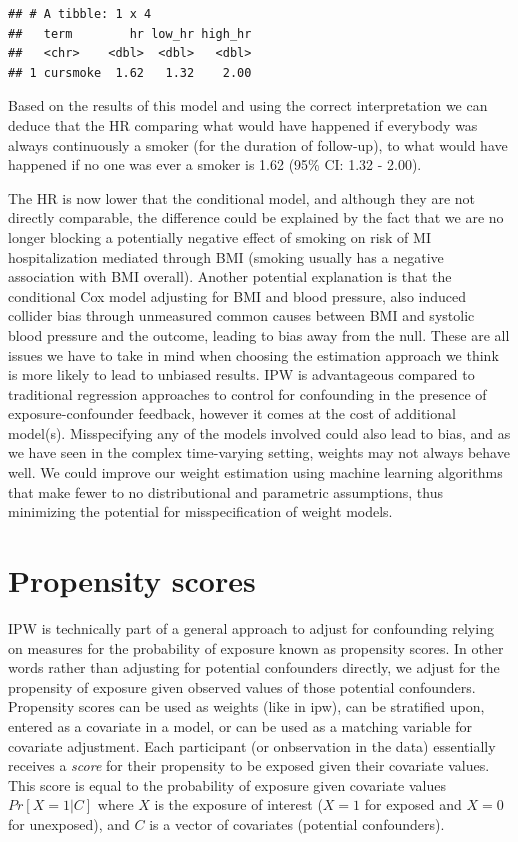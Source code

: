 \documentclass[
]{book}
\begin{document}
\begin{verbatim}
## # A tibble: 1 x 4
##   term        hr low_hr high_hr
##   <chr>    <dbl>  <dbl>   <dbl>
## 1 cursmoke  1.62   1.32    2.00
\end{verbatim}

Based on the results of this model and using the correct interpretation we can deduce that the HR comparing what would have happened if everybody was always continuously a smoker (for the duration of follow-up), to what would have happened if no one was ever a smoker is 1.62 (95\% CI: 1.32 - 2.00).

The HR is now lower that the conditional model, and although they are not directly comparable, the difference could be explained by the fact that we are no longer blocking a potentially negative effect of smoking on risk of MI hospitalization mediated through BMI (smoking usually has a negative association with BMI overall). Another potential explanation is that the conditional Cox model adjusting for BMI and blood pressure, also induced collider bias through unmeasured common causes between BMI and systolic blood pressure and the outcome, leading to bias away from the null. These are all issues we have to take in mind when choosing the estimation approach we think is more likely to lead to unbiased results. IPW is advantageous compared to traditional regression approaches to control for confounding in the presence of exposure-confounder feedback, however it comes at the cost of additional model(s). Misspecifying any of the models involved could also lead to bias, and as we have seen in the complex time-varying setting, weights may not always behave well. We could improve our weight estimation using machine learning algorithms that make fewer to no distributional and parametric assumptions, thus minimizing the potential for misspecification of weight models.

\hypertarget{propensity-scores}{%
\section{Propensity scores}\label{propensity-scores}}

IPW is technically part of a general approach to adjust for confounding relying on measures for the probability of exposure known as propensity scores. In other words rather than adjusting for potential confounders directly, we adjust for the propensity of exposure given observed values of those potential confounders. Propensity scores can be used as weights (like in ipw), can be stratified upon, entered as a covariate in a model, or can be used as a matching variable for covariate adjustment. Each participant (or onbservation in the data) essentially receives a \emph{score} for their propensity to be exposed given their covariate values. This score is equal to the probability of exposure given covariate values \(Pr[X=1|C]\) where \(X\) is the exposure of interest (\(X=1\) for exposed and \(X=0\) for unexposed), and \(C\) is a vector of covariates (potential confounders).
\end{document}
